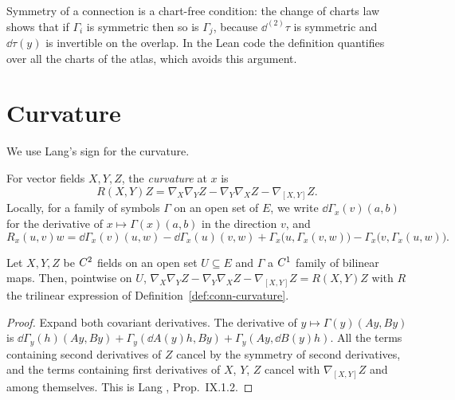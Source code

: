 \begin{remark}
  Symmetry of a connection is a chart-free condition: the change of charts law shows that if
  $\Gamma_i$ is symmetric then so is $\Gamma_j$, because $\dd^{(2)}\tau$ is symmetric and
  $\dd\tau(y)$ is invertible on the overlap. In the Lean code the definition quantifies over all
  the charts of the atlas, which avoids this argument.
\end{remark}

\section{Curvature}

We use Lang's sign for the curvature.

\begin{definition}[Curvature]
  \label{def:conn-curvature}
  \leanok
  For vector fields $X, Y, Z$, the \emph{curvature} at $x$ is
  \[
    R(X, Y) Z = \nabla_X \nabla_Y Z - \nabla_Y \nabla_X Z - \nabla_{[X, Y]} Z .
  \]
  Locally, for a family of symbols $\Gamma$ on an open set of $E$, we write
  $\dd\Gamma_x(v)(a, b)$ for the derivative of $x \mapsto \Gamma(x)(a, b)$ in the direction $v$,
  and
  \[
    R_x(u, v) w = \dd\Gamma_x(v)(u, w) - \dd\Gamma_x(u)(v, w)
      + \Gamma_x\bigl(u, \Gamma_x(v, w)\bigr) - \Gamma_x\bigl(v, \Gamma_x(u, w)\bigr).
  \]
\end{definition}

\begin{lemma}
  \label{lem:conn-local-curv}
  \leanok
  Let $X, Y, Z$ be $C^{2}$ fields on an open set $U \subseteq E$ and $\Gamma$ a $C^{1}$ family of
  bilinear maps. Then, pointwise on $U$,
  $\nabla_X \nabla_Y Z - \nabla_Y \nabla_X Z - \nabla_{[X, Y]} Z = R(X, Y) Z$
  with $R$ the trilinear expression of Definition~\ref{def:conn-curvature}.
\end{lemma}

\begin{proof}
  \leanok
  Expand both covariant derivatives. The derivative of $y \mapsto \Gamma(y)(A y, B y)$ is
  $\dd\Gamma_y(h)(A y, B y) + \Gamma_y(\dd A(y) h, B y) + \Gamma_y(A y, \dd B(y) h)$. All the
  terms containing second derivatives of $Z$ cancel by the symmetry of second derivatives, and
  the terms containing first derivatives of $X$, $Y$, $Z$ cancel with $\nabla_{[X,Y]} Z$ and
  among themselves. This is Lang \cite{Lan99}, Prop.~IX.1.2.
\end{proof}


